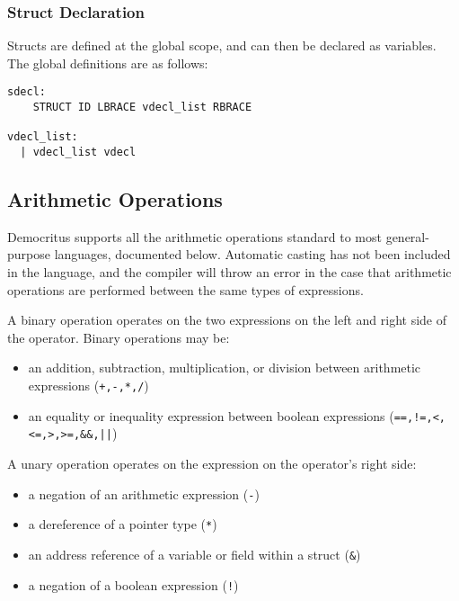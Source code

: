     \subsubsection{Struct Declaration}
      Structs are defined at the global scope, and can then be declared as variables. The global definitions are as follows: 

      \begin{verbatim}
sdecl:
    STRUCT ID LBRACE vdecl_list RBRACE

vdecl_list:
  | vdecl_list vdecl
      \end{verbatim}


      \iffalse
  		\medskip \noindent 
      Array assignment is done with brackets. Note that the size of the array must be specified in the declaration. 
  		\fi
		
		
	\subsection{Arithmetic Operations}
		Democritus supports all the arithmetic operations standard to most general-purpose languages, documented below. Automatic casting has not been included in the language, and the compiler will throw an error in the case that arithmetic operations are performed between the same types of expressions.  

    \noindent
    A binary operation operates on the two expressions on the left and right side of the operator. Binary operations may be:
    \begin{itemize}
      \item an addition, subtraction, multiplication, or division between arithmetic expressions (\texttt{+,-,*,/})
      \item an equality or inequality expression between boolean expressions (\verb^==,!=,<,<=,>,>=,&&,||^)
    \end{itemize}

    \noindent
    A unary operation operates on the expression on the operator's right side:
    \begin{itemize}
      \item a negation of an arithmetic expression (\texttt{-})
      \item a dereference of a pointer type (\texttt{*})
      \item an address reference of a variable or field within a struct (\verb|&|)
      \item a negation of a boolean expression (\texttt{!})
    \end{itemize}
		
